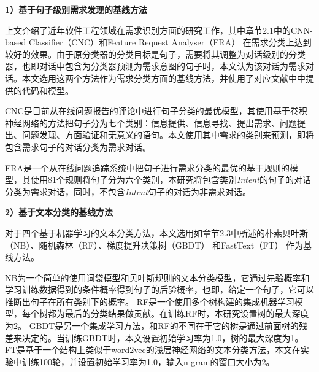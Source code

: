 \textbf{1）基于句子级别需求发现的基线方法}

上文介绍了近年软件工程领域在需求识别方面的研究工作，其中章节2.1中的CNN-based Classifier（CNC）\cite{Huang2018Automating}和Feature Request Analyser（FRA） \cite{shi2017understanding}在需求分类上达到较好的效果。由于原分类器的分类目标是句子，需要将其调整为对话级别的分类器，也即对话中包含为分类器预测为需求意图的句子时，本文认为该对话为需求对话。本文选用这两个方法作为需求分类方面的基线方法，并使用了对应文献中中提供的代码和模型。

CNC是目前从在线问题报告的评论中进行句子分类的最优模型，其使用基于卷积神经网络的方法把句子分为七个类别：信息提供、信息寻找、提出需求、问题提出、问题发现、方面验证和无意义的语句。本文使用其中需求的类别来预测，即将包含需求句子的对话分类为需求对话。

FRA是一个从在线问题追踪系统中把句子进行需求分类的最优的基于规则的模型，其使用81个规则将句子分为六个类别，本研究将包含类别\textit{Intent}的句子的对话分类为需求对话，同时，不包含\textit{Intent}句子的对话为非需求对话。

\textbf{2）基于文本分类的基线方法}

对于四个基于机器学习的文本分类方法，本文选用如章节2.3中所述的朴素贝叶斯（NB）\cite{mccallum1998comparison}、随机森林（RF）\cite{liaw2002classification}、梯度提升决策树（GBDT）\cite{ke2017lightgbm} 和FastText（FT）\cite{joulin2016bag} 作为基线方法。

NB为一个简单的使用词袋模型和贝叶斯规则的文本分类模型，它通过先验概率和学习训练数据得到的条件概率得到句子的后验概率，也即，给定一个句子，它可以推断出句子在所有类别下的概率。
RF是一个使用多个树构建的集成机器学习模型，每个树都为最后的分类结果做贡献。在训练RF时，本研究设置树的最大深度为2。
GBDT是另一个集成学习方法，和RF的不同在于它的树是通过前面树的残差来决定的。当训练GBDT时，本文设置初始学习率为1.0，树的最大深度为1。
FT是基于一个结构上类似于word2vec的浅层神经网络的文本分类方法，本文在实验中训练100轮，并设置初始学习率为1.0，输入n-gram的窗口大小为2。

